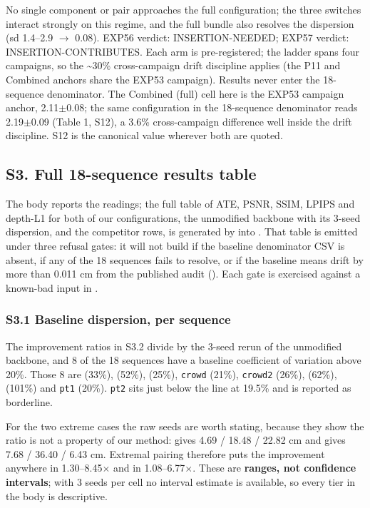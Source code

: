 No single component or pair approaches the full configuration; the three switches interact strongly on this regime, and the full bundle also resolves the dispersion (sd 1.4--2.9 $\rightarrow$ 0.08). EXP56 verdict: INSERTION-NEEDED; EXP57 verdict: INSERTION-CONTRIBUTES. Each arm is pre-registered; the ladder spans four campaigns, so the \textasciitilde{}30\% cross-campaign drift discipline applies (the P11 and Combined anchors share the EXP53 campaign). Results never enter the 18-sequence denominator. The Combined (full) cell here is the EXP53 campaign anchor, 2.11$\pm$0.08; the same configuration in the 18-sequence denominator reads 2.19$\pm$0.09 (Table 1, S12), a 3.6\% cross-campaign difference well inside the drift discipline. S12 is the canonical value wherever both are quoted.


\subsection{S3. Full 18-sequence results table}


The body reports the readings; the full table of ATE, PSNR, SSIM, LPIPS and depth-L1 for both of our configurations, the unmodified backbone with its 3-seed dispersion, and the competitor rows, is generated by  into . That table is emitted under three refusal gates: it will not build if the baseline denominator CSV is absent, if any of the 18 sequences fails to resolve, or if the baseline means drift by more than 0.011 cm from the published audit (). Each gate is exercised against a known-bad input in .


\subsubsection{S3.1 Baseline dispersion, per sequence}


The improvement ratios in S3.2 divide by the 3-seed rerun of the unmodified backbone, and 8 of the 18 sequences have a baseline coefficient of variation above 20\%. Those 8 are  (33\%),  (52\%),  (25\%), \texttt{crowd} (21\%), \texttt{crowd2} (26\%),  (62\%),  (101\%) and \texttt{pt1} (20\%). \texttt{pt2} sits just below the line at 19.5\% and is reported as borderline.


For the two extreme cases the raw seeds are worth stating, because they show the ratio is not a property of our method:  gives 4.69 / 18.48 / 22.82 cm and  gives 7.68 / 36.40 / 6.43 cm. Extremal pairing therefore puts the  improvement anywhere in 1.30--8.45$\times$ and  in 1.08--6.77$\times$. These are \textbf{ranges, not confidence intervals}; with 3 seeds per cell no interval estimate is available, so every tier in the body is descriptive.


